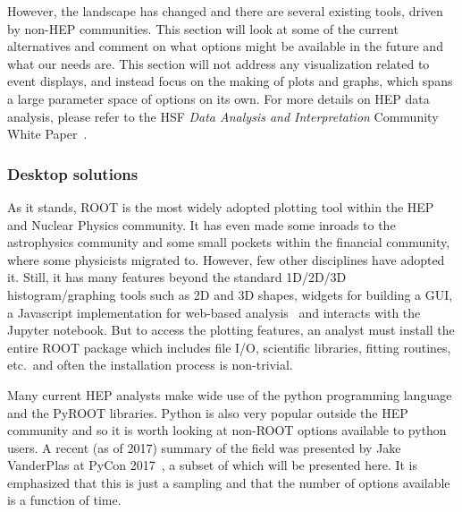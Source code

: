 \documentclass[12pt,a4paper]{article}
\begin{document}
However, the landscape has changed and there are several existing tools, driven by non-HEP communities. This section will look at
some of the current alternatives and comment on what options might be available in the future and what our needs are. This section
will not address any visualization related to event displays, and instead focus on the making of plots and graphs, which 
spans a large parameter space of options on its own. For more details on HEP data analysis, please refer to the HSF \emph{Data Analysis and Interpretation} Community White Paper~\cite{HSF-CWP-2017-05}.

\hypertarget{stats-desktop}{%
\subsubsection{Desktop solutions}\label{stats-desktop}}

As it stands, ROOT is the most widely adopted plotting tool within the HEP and Nuclear Physics community.
It has even made some inroads to the astrophysics community and some small pockets within the financial community,
where some physicists migrated to. However, few other disciplines have adopted it. Still, it has many features beyond
the standard 1D/2D/3D histogram/graphing tools such as 2D and 3D shapes, widgets for building a GUI, a Javascript
implementation for web-based analysis~\cite{rootjs} and interacts with the Jupyter notebook. But to
access the plotting features, an analyst must install the entire ROOT package which includes file I/O, scientific
libraries, fitting routines, etc.\ and often the installation process is non-trivial.

Many current HEP analysts make wide use of the python programming language and the PyROOT libraries.
Python is also very popular outside the HEP community and so it is worth looking at non-ROOT options available to python users.
A recent (as of 2017) summary of the field was presented by Jake VanderPlas at PyCon 2017~\cite{VanderPlas2017}, a subset
of which will be presented here. It is emphasized that this is just a sampling and that the number of options available
is a function of time.
\end{document}
